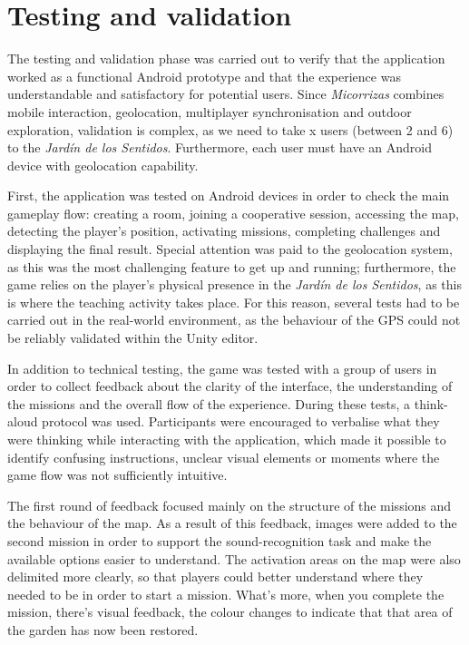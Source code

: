 \chapter{Testing and validation}
The testing and validation phase was carried out to verify that the application worked as a functional Android prototype and that the experience was understandable and satisfactory for potential users. Since \textit{Micorrizas} combines mobile interaction, geolocation, multiplayer synchronisation and outdoor exploration, validation is complex, as we need to take x users (between 2 and 6) to the \textit{Jardín de los Sentidos}. Furthermore, each user must have an Android device with geolocation capability.

First, the application was tested on Android devices in order to check the main gameplay flow: creating a room, joining a cooperative session, accessing the map, detecting the player’s position, activating missions, completing challenges and displaying the final result. Special attention was paid to the geolocation system, as this was the most challenging feature to get up and running; furthermore, the game relies on the player’s physical presence in the \textit{Jardín de los Sentidos}, as this is where the teaching activity takes place. For this reason, several tests had to be carried out in the real-world environment, as the behaviour of the GPS could not be reliably validated within the Unity editor.

In addition to technical testing, the game was tested with a group of users in order to collect feedback about the clarity of the interface, the understanding of the missions and the overall flow of the experience. During these tests, a think-aloud protocol was used. Participants were encouraged to verbalise what they were thinking while interacting with the application, which made it possible to identify confusing instructions, unclear visual elements or moments where the game flow was not sufficiently intuitive.

The first round of feedback focused mainly on the structure of the missions and the behaviour of the map. As a result of this feedback, images were added to the second mission in order to support the sound-recognition task and make the available options easier to understand. The activation areas on the map were also delimited more clearly, so that players could better understand where they needed to be in order to start a mission. What’s more, when you complete the mission, there’s visual feedback, the colour changes to indicate that that area of the garden has now been restored.


